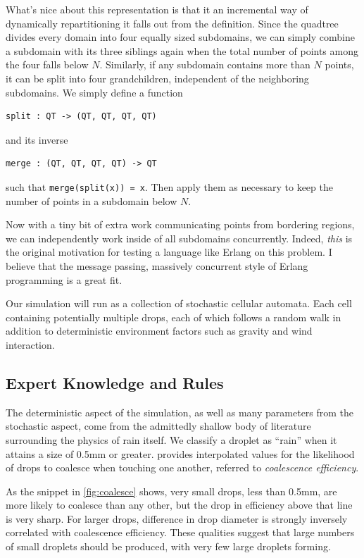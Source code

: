 \documentclass[twocolumn,a4paper,10pt]{article}
\begin{document}
What's nice about this representation is that it an incremental way of
dynamically repartitioning it falls out from the definition. Since the quadtree
divides every domain into four equally sized subdomains, we can simply combine a
subdomain with its three siblings again when the total number of points among
the four falls below $N$. Similarly, if any subdomain contains more than $N$
points, it can be split into four grandchildren, independent of the neighboring
subdomains. We simply define a function
\begin{verbatim}
split : QT -> (QT, QT, QT, QT)
\end{verbatim}
and its inverse
\begin{verbatim}
merge : (QT, QT, QT, QT) -> QT
\end{verbatim}
such that \texttt{merge(split(x)) = x}. Then apply them as necessary to keep the
number of points in a subdomain below $N$.

Now with a tiny bit of extra work communicating points from bordering regions,
we can independently work inside of all subdomains concurrently. Indeed,
\emph{this} is the original motivation for testing a language like Erlang on
this problem. I believe that the message passing, massively concurrent style of
Erlang programming is a great fit.

Our simulation will run as a collection of stochastic cellular automata. Each
cell containing potentially multiple drops, each of which follows a random walk
in addition to deterministic environment factors such as gravity and wind
interaction.


\subsection{Expert Knowledge and Rules}
\label{sec:rules}

The deterministic aspect of the simulation, as well as many parameters from the
stochastic aspect, come from the admittedly shallow body of literature
surrounding the physics of rain itself. We classify a droplet as ``rain'' when
it attains a size of 0.5mm or greater. \citet{hu1998} provides interpolated
values for the likelihood of drops to coalesce when touching one another,
referred to \emph{coalescence efficiency}.

As the snippet in \autoref{fig:coalesce} shows, very small drops, less than
0.5mm, are more likely to coalesce than any other, but the drop in efficiency
above that line is very sharp. For larger drops, difference in drop diameter is
strongly inversely correlated with coalescence efficiency. These qualities
suggest that large numbers of small droplets should be produced, with very few
large droplets forming.
\end{document}
